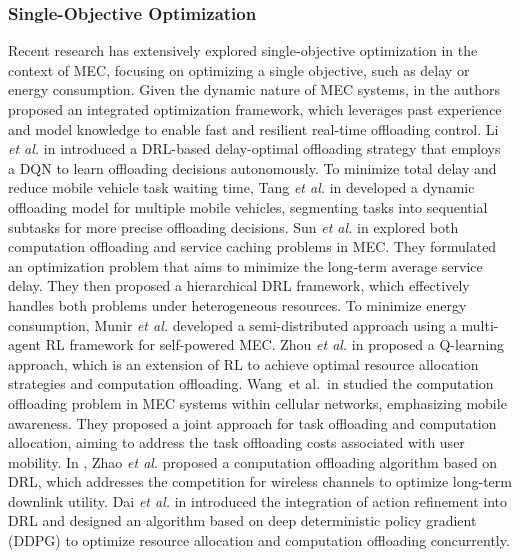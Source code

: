 \documentclass[12pt,draftclsnofoot,onecolumn]{IEEEtran}
\begin{document}
		\subsubsection{Single-Objective Optimization} 
		Recent research has extensively explored single-objective optimization in the context of MEC, focusing on optimizing a single objective, such as delay or energy consumption. 
		Given the dynamic nature of MEC systems, in \cite{li2022integrated} the authors proposed an integrated optimization framework, which leverages past experience and model knowledge to enable fast and resilient real-time offloading control. 
		Li \textit{et al.} in \cite{li2020joint} introduced a DRL-based delay-optimal offloading strategy that employs a DQN to learn offloading decisions autonomously. 
		To minimize total delay and reduce mobile vehicle task waiting time, Tang \textit{et al.} in \cite{tang2022double} developed a dynamic offloading model for multiple mobile vehicles, segmenting tasks into sequential subtasks for more precise offloading decisions.
		Sun \textit{et al.} in \cite{sun2024hierarchical} explored both computation offloading and service caching problems in MEC. They formulated an optimization problem that aims to minimize the long-term average service delay. They then proposed a hierarchical DRL framework, which effectively handles both problems under heterogeneous resources.
		To minimize energy consumption, Munir \textit{et al.} \cite{munir2021multi} developed a semi-distributed approach using a multi-agent RL framework for self-powered MEC. 
		Zhou \textit{et al.} in \cite{zhou2021deep} proposed a Q-learning approach, which is an extension of RL to achieve optimal resource allocation strategies and computation offloading.
		Wang et al. in \cite{wang2020reinforcement} studied the computation offloading problem in MEC systems within cellular networks, emphasizing mobile awareness. They proposed a joint approach for task offloading and computation allocation, aiming to address the task offloading costs associated with user mobility. 
		In \cite{zhao2019deep}, Zhao \textit{et al.} proposed a computation offloading algorithm based on DRL, which addresses the competition for wireless channels to optimize long-term downlink utility.
		Dai \textit{et al.} in \cite{dai2020edge} introduced the integration of action refinement into DRL and designed an algorithm based on deep deterministic policy gradient (DDPG) to optimize resource allocation and computation offloading concurrently.
		
\end{document}

